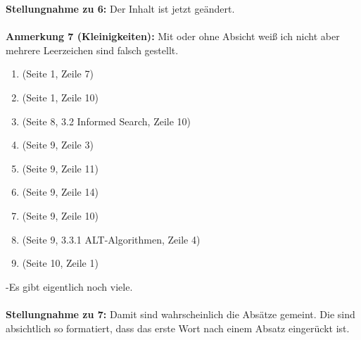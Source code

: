 \documentclass[a4paper,12pt]{book}
\begin{document}
\textbf{Stellungnahme zu 6:} Der Inhalt ist jetzt geändert.
\\ \\
\textbf{Anmerkung 7 (Kleinigkeiten):}
Mit oder ohne Absicht weiß ich nicht aber mehrere Leerzeichen sind falsch gestellt.
\begin{enumerate}
	\item  (Seite 1, Zeile 7)
	\item  (Seite 1, Zeile 10)
	\item  (Seite 8, 3.2 Informed Search, Zeile 10)
	\item  (Seite 9, Zeile 3)
	\item  (Seite 9, Zeile 11)
	\item  (Seite 9, Zeile 14)
	\item  (Seite 9, Zeile 10)
	\item  (Seite 9, 3.3.1 ALT-Algorithmen, Zeile 4)
	\item  (Seite 10, Zeile 1)
\end{enumerate}
-Es gibt eigentlich noch viele.
\\ \\
\textbf{Stellungnahme zu 7:}
Damit sind wahrscheinlich die Absätze gemeint. Die sind absichtlich so formatiert, dass das erste Wort nach einem Absatz eingerückt ist.
\\
\end{document}
